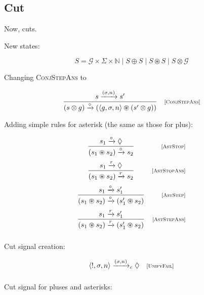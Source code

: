 \subsection{Cut}

Now, cuts.

New states:

\[
S = \mathcal{G}\times\Sigma\times\mathbb{N}\mid S\oplus S \mid  S \circledast S \mid S \otimes \mathcal{G}
\]


Changing \textsc{ConjStepAns} to

  \[
  \begin{array}{cr}
    \dfrac{s \xrightarrow{(\sigma, n)} s'}{(s \otimes g) \xrightarrow{\circ} (\left<{g, \sigma, n}\right> \circledast (s' \otimes g))} & \mbox{\scriptsize{[\textsc{ConjStepAns}]}} 
  \end{array}
  \]
  
Adding simple rules for asterisk (the same as those for plus):

  \[
  \begin{array}{cr}
    \dfrac{s_1 \xrightarrow{\circ} \Diamond}{(s_1 \circledast s_2) \xrightarrow{\circ} s_2} & \mbox{\scriptsize{[\textsc{AstStop}]}}\\[5mm]
    \dfrac{s_1 \xrightarrow{r} \Diamond}{(s_1 \circledast s_2) \xrightarrow{r} s_2} & \mbox{\scriptsize{[\textsc{AstStopAns}]}}\\[5mm]
    \dfrac{s_1 \xrightarrow{\circ} s'_1}{(s_1 \circledast s_2) \xrightarrow{\circ} (s'_1 \circledast s_2)} &\mbox{\scriptsize{[\textsc{AstStep}]}}\\[5mm]
    \dfrac{s_1 \xrightarrow{r} s'_1}{(s_1 \circledast s_2) \xrightarrow{r} (s'_1 \circledast s_2)} &\mbox{\scriptsize{[\textsc{AstStepAns}]}}\\[5mm]
  \end{array}
\]
  
Cut signal creation:

  \[
  \begin{array}{cr}
    \left<{!, \sigma, n}\right> \xrightarrow{(\sigma, n)}_c \Diamond &\mbox{\scriptsize{[\textsc{UnifyFail}]}} \\[2mm]
  \end{array}
\]

Cut signal for pluses and asterisks:

